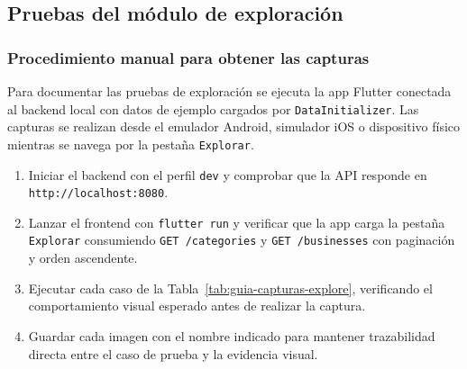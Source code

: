 \documentclass[12pt,a4paper,twoside]{report}
\begin{document}
\subsection{Pruebas del módulo de exploración}

\subsubsection{Procedimiento manual para obtener las capturas}

Para documentar las pruebas de exploración se ejecuta la app Flutter conectada al backend local con datos de ejemplo cargados por \texttt{DataInitializer}. Las capturas se realizan desde el emulador Android, simulador iOS o dispositivo físico mientras se navega por la pestaña \texttt{Explorar}.
\begin{enumerate}
  \item Iniciar el backend con el perfil \texttt{dev} y comprobar que la API responde en \texttt{http://localhost:8080}.
  \item Lanzar el frontend con \texttt{flutter run} y verificar que la app carga la pestaña \texttt{Explorar} consumiendo \texttt{GET /categories} y \texttt{GET /businesses} con paginación y orden ascendente.
  \item Ejecutar cada caso de la Tabla~\ref{tab:guia-capturas-explore}, verificando el comportamiento visual esperado antes de realizar la captura.
  \item Guardar cada imagen con el nombre indicado para mantener trazabilidad directa entre el caso de prueba y la evidencia visual.
\end{enumerate}
\end{document}
